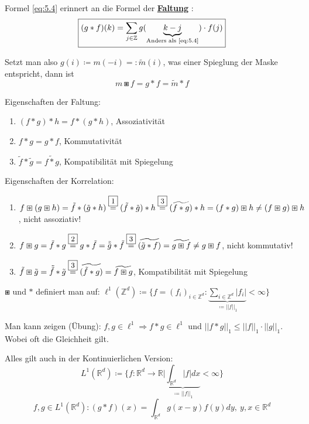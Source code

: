 \documentclass[ngerman]{article}
\theoremstyle{plain}
\theoremstyle{definition}
\numberwithin{equation}{section}
\newcommand{\norm}[1] {
\left|\left| #1 \right|\right|
}
\newcommand{\abs}[1] {
\left| #1 \right|
}
\newcommand{\R}[0] {
\mathbb R
}
\newcommand{\Z}[0] {
    \mathbb Z
}
\newcommand{\mim}[1] {
\underline{\textbf{#1\index{#1}}}
}
\newcommand{\C}[0]{
    \cdot
}
\begin{document}
        Formel \eqref{eq:5.4} erinnert an die Formel der \mim{Faltung}:
        \begin{equation}\label{eq:5.5}
            \framebox{$\displaystyle (g * f)(k) = \sum_{j \in \Z} g(\underbrace{k-j}_{\text{Anders als \eqref{eq:5.4}}}) \cdot f(j)$}
        \end{equation}

        Setzt man also $g(i)  \coloneqq  m(-i) =: \tilde m(i)$, was einer Spieglung der Maske entspricht, dann ist
        \[m \boxast f = g * f = \tilde m * f\]

        Eigenschaften der Faltung:
        \begin{enumerate}[label=\framebox{\arabic *}]
            \item $(f * g) * h = f * (g* h)$, Assoziativität
            \item $f*g=g*f$, Kommutativität
            \item $\tilde f * \tilde g = \widetilde{f * g}$, Kompatibilität mit Spiegelung
        \end{enumerate}
        Eigenschaften der Korrelation:
        \begin{enumerate}[label=\framebox{\arabic *'}]
            \item $f \boxast (g \boxast h) = \tilde f * ( \tilde g* h) \overset{\framebox{\small 1}}{=} ( \tilde f * \tilde g) * h \overset{\framebox{\small 3}}{=} (\widetilde{f * g}) * h = (f * g) \boxast h \neq (f \boxast g) \boxast h$, nicht assoziativ!
            \item $f \boxast g = \tilde f * g \overset{\framebox{\small 2}}{=} g * \tilde f = \tilde{\tilde g} * \tilde f \overset{\framebox{\small 3}}{=} \widetilde{(\tilde g * f)} = \widetilde{g \boxast f} \neq g \boxast f$, nicht kommutativ!
            \item $\tilde f \boxast \tilde g = \tilde{\tilde f} * \tilde g \overset{\framebox{\small 3}}{=} \widetilde{(\tilde f * g)} = \widetilde{f \boxast g}$, Kompatibilität mit Spiegelung
        \end{enumerate}

	$\boxast$ und $*$ definiert man auf: $\ell^1(\Z^d) \coloneqq \{f=(f_i)_{i \in \Z^d} : \underbrace{\sum_{i \in \Z^d}\abs{f_i}}_{ \coloneqq \norm{f}_1} < \infty\}$

	Man kann zeigen (Übung): $f,g \in \ell^1 \Rightarrow f * g \in \ell^1$ und $\norm{f * g}_1 \leq \norm{f}_1 \C \norm{g}_1$.
    Wobei oft die Gleichheit gilt.

    Alles gilt auch in der Kontinuierlichen Version:
    \[L^1(\R^d)  \coloneqq  \{f:\R^d \to \R | \underbrace{\int_{\R^d}\abs{f} dx}_{ \coloneqq \norm{f}_1} < \infty\}\]
    \[f,g \in L^1(\R^d): (g*f)(x)=\int_{\R^d}g(x-y)f(y) dy, \ y,x \in \R^d\]
\end{document}
